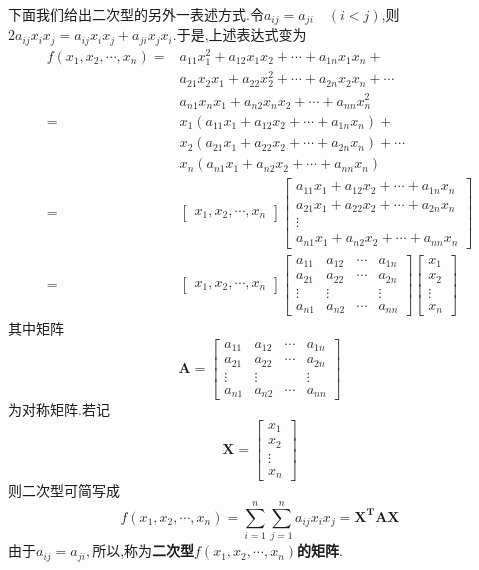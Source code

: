 \documentclass[9pt,a4paper]{book}
\begin{document}
\begin{defination}[二次型及二次型矩阵的定义]
	下面我们给出二次型的另外一表述方式.令$ a_{ij}=a_{ji}\quad (i<j) $,则$ 2a_{ij}x_ix_j=a_{ij}x_ix_j+a_{ji}x_jx_i $.于是,上述表达式变为
	\begin{align*}
	f( x_1,x_2,\cdots,x_n )=&a_{11}x_1^2+a_{12}x_1x_2+\cdots+a_{1n}x_1x_n+\\
	&a_{21}x_2x_1+a_{22}x_2^2+\cdots+a_{2n}x_2x_n+\cdots\\
	&a_{n1}x_nx_1+a_{n2}x_nx_2+\cdots+a_{nn}x_n^2\\
	=&x_1(a_{11}x_1+a_{12}x_2+\cdots+a_{1n}x_n)+\\
	&x_2(a_{21}x_1+a_{22}x_2+\cdots+a_{2n}x_n)+\cdots\\
	&x_n(a_{n1}x_1+a_{n2}x_2+\cdots+a_{nn}x_n)\\
	=&\begin{bmatrix}
	x_1,x_2,\cdots,x_n
	\end{bmatrix}\begin{bmatrix}
	a_{11}x_1+a_{12}x_2+\cdots+a_{1n}x_n\\
	a_{21}x_1+a_{22}x_2+\cdots+a_{2n}x_n\\
	\vdots\\
	a_{n1}x_1+a_{n2}x_2+\cdots+a_{nn}x_n
	\end{bmatrix}\\
	=&\begin{bmatrix}
	x_1,x_2,\cdots,x_n
	\end{bmatrix}
	\begin{bmatrix}
	a_{11}&a_{12}&\cdots&a_{1n}\\
	a_{21}&a_{22}&\cdots&a_{2n}\\
	\vdots&\vdots& &\vdots\\
	a_{n1}&a_{n2}&\cdots&a_{nn}
	\end{bmatrix}
	\begin{bmatrix}
	x_1\\x_2\\\vdots\\x_n
	\end{bmatrix}
	\end{align*}
其中矩阵\[ \bm{A}=\begin{bmatrix}
a_{11}&a_{12}&\cdots&a_{1n}\\
a_{21}&a_{22}&\cdots&a_{2n}\\
\vdots&\vdots& &\vdots\\
a_{n1}&a_{n2}&\cdots&a_{nn}
\end{bmatrix} \]为对称矩阵.若记\[ \bm{X}=	\begin{bmatrix}
x_1\\x_2\\\vdots\\x_n
\end{bmatrix} \]则二次型可简写成\[ f( x_1,x_2,\cdots,x_n )=\sum_{i=1}^n\sum_{j=1}^na_{ij}x_ix_j=\bm{X}^{\mathbf{T}}\bm{A}\bm{X} \]由于$ a_{ij}=a_{ji} ,$所以,称为\textbf{二次型$ f( x_1,x_2,\cdots,x_n ) $的矩阵}.
\end{defination}
\end{document}
